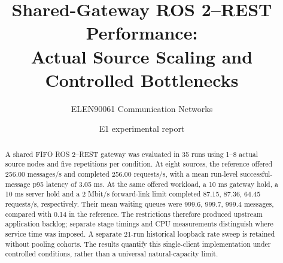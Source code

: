 \documentclass[11pt,a4paper]{article}
\title{Shared-Gateway ROS 2--REST Performance:\\Actual Source Scaling and Controlled Bottlenecks}
\author{ELEN90061 Communication Networks}
\date{E1 experimental report}
\begin{document}
\maketitle
\begin{abstract}
A shared FIFO ROS 2--REST gateway was evaluated in 35 runs using 1--8 actual source nodes and five repetitions per condition. At eight sources, the reference offered 256.00 messages/s and completed 256.00 requests/s, with a mean run-level successful-message p95 latency of 3.05 ms. At the same offered workload, a 10 ms gateway hold, a 10 ms server hold and a 2 Mbit/s forward-link limit completed 87.15, 87.36, 64.45 requests/s, respectively. Their mean waiting queues were 999.6, 999.7, 999.4 messages, compared with 0.14 in the reference. The restrictions therefore produced upstream application backlog; separate stage timings and CPU measurements distinguish where service time was imposed. A separate 21-run historical loopback rate sweep is retained without pooling cohorts. The results quantify this single-client implementation under controlled conditions, rather than a universal natural-capacity limit.
\end{abstract}

\clearpage
\appendix

\end{document}
